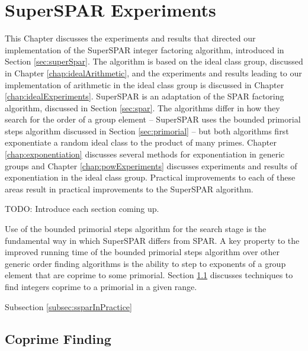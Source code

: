 \documentclass{ucalgthes1}
\theoremstyle{definition}
\begin{document}
\chapter{SuperSPAR Experiments}
\label{chap:ssparExperiments}

This Chapter discusses the experiments and results that directed our implementation of the SuperSPAR integer factoring algorithm, introduced in Section \ref{sec:superSpar}.  The algorithm is based on the ideal class group, discussed in Chapter \ref{chap:idealArithmetic}, and the experiments and results leading to our implementation of arithmetic in the ideal class group is discussed in Chapter \ref{chap:idealExperiments}.  SuperSPAR is an adaptation of the SPAR factoring algorithm, discussed in Section \ref{sec:spar}.  The algorithms differ in how they search for the order of a group element -- SuperSPAR uses the bounded primorial steps algorithm discussed in Section \ref{sec:primorial} -- but both algorithms first exponentiate a random ideal class to the product of many primes.  Chapter \ref{chap:exponentiation} discusses several methods for exponentiation in generic groups and Chapter \ref{chap:powExperiments} discusses experiments and results of exponentiation in the ideal class group.  Practical improvements to each of these areas result in practical improvements to the SuperSPAR algorithm.


TODO: Introduce each section coming up.

Use of the bounded primorial steps algorithm for the search stage is the fundamental way in which SuperSPAR differs from SPAR.  A key property to the improved running time of the bounded primorial steps algorithm over other generic order finding algorithms is the ability to step to exponents of a group element that are coprime to some primorial.  Section \ref{sec:ssparCoprimeFinding}  discusses techniques to find integers coprime to a primorial in a given range.

Subsection \ref{subsec:ssparInPractice}



\section{Coprime Finding}
\label{sec:ssparCoprimeFinding}

\end{document}
